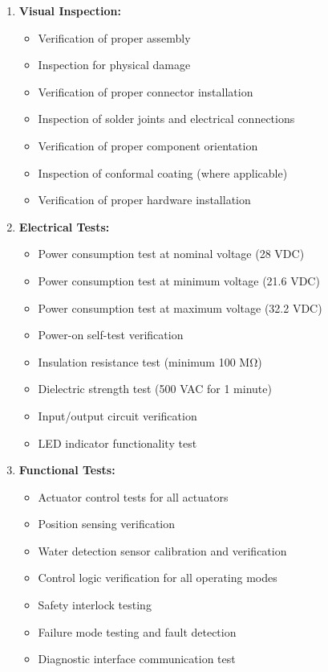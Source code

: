 \documentclass[12pt,a4paper,twoside,openright]{book}
\begin{document}
\begin{enumerate}
    \item \textbf{Visual Inspection:}
    \begin{itemize}
        \item Verification of proper assembly
        \item Inspection for physical damage
        \item Verification of proper connector installation
        \item Inspection of solder joints and electrical connections
        \item Verification of proper component orientation
        \item Inspection of conformal coating (where applicable)
        \item Verification of proper hardware installation
    \end{itemize}
    
    \item \textbf{Electrical Tests:}
    \begin{itemize}
        \item Power consumption test at nominal voltage (28 VDC)
        \item Power consumption test at minimum voltage (21.6 VDC)
        \item Power consumption test at maximum voltage (32.2 VDC)
        \item Power-on self-test verification
        \item Insulation resistance test (minimum 100 MΩ)
        \item Dielectric strength test (500 VAC for 1 minute)
        \item Input/output circuit verification
        \item LED indicator functionality test
    \end{itemize}
    
    \item \textbf{Functional Tests:}
    \begin{itemize}
        \item Actuator control tests for all actuators
        \item Position sensing verification
        \item Water detection sensor calibration and verification
        \item Control logic verification for all operating modes
        \item Safety interlock testing
        \item Failure mode testing and fault detection
        \item Diagnostic interface communication test
    \end{itemize}
    

\end{enumerate}
\end{document}
